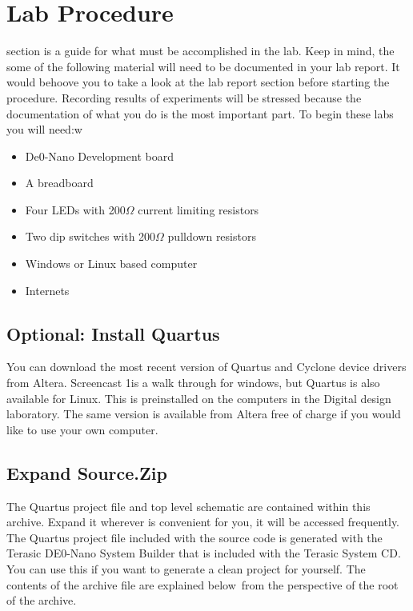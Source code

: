  \section{Lab Procedure}
     section is a guide for what must be accomplished in the lab. Keep in mind, the some of the following material will need to be documented in your lab report. It would behoove you to take a look at the lab report section before starting the procedure. Recording results of experiments will be stressed because the documentation of what you do is the most important part. To begin these labs you will need:w
    \begin{itemize}
      \item De0-Nano Development board
      \item A breadboard
      \item Four LEDs with 200$\Omega$ current limiting resistors
      \item Two dip switches with 200$\Omega$ pulldown resistors
      \item Windows or Linux based computer
      \item Internets
    \end{itemize}

    \subsection{Optional: Install Quartus}
    You can download the most recent version of Quartus and Cyclone device drivers from Altera. Screencast 1is a walk through for windows, but Quartus is also available for Linux. This is preinstalled on the computers in the Digital design laboratory. The same version is available from Altera free of charge if you would like to use your own computer.

    \subsection{Expand Source.Zip}
    The Quartus project file and top level schematic are contained within this archive. Expand it wherever is convenient for you, it will be accessed frequently. The Quartus project file included with the source code is generated with the Terasic DE0-Nano System Builder that is included with the Terasic System CD. You can use this if you want to generate a clean project for yourself. The contents of the archive file are explained below from the perspective of the root of the archive.

